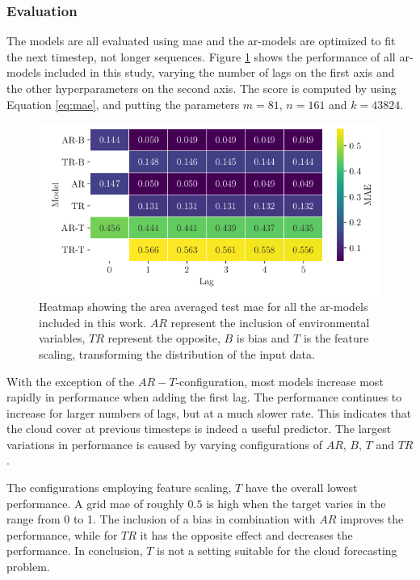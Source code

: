 \subsubsection{Evaluation}
The models are all evaluated using \acrfull{mae} and the \acrshort{ar}-models are optimized to fit the next timestep, not longer sequences. Figure \ref{fig:heatmap_ar_models} shows the performance of all \acrshort{ar}-models included in this study, varying the number of lags on the first axis and the other hyperparameters on the second axis. The score is computed by using Equation \eqref{eq:mae}, and putting the parameters $m = 81$, $n=161$ and $k=43824$. 
\begin{figure}
    \centering
    \includegraphics{python_figs/heat_ar_model_mae_test_score.png}
    \caption{Heatmap showing the area averaged test \acrshort{mae} for all the \acrshort{ar}-models included in this work. $AR$ represent the inclusion of environmental variables, $TR$ represent the opposite, $B$ is bias and $T$ is the feature scaling, transforming the distribution of the input data.
    }
    \label{fig:heatmap_ar_models}
\end{figure}
With the exception of the $AR-T$-configuration, most models increase most rapidly in performance when adding the first lag. The performance continues to increase for larger numbers of lags, but at a much slower rate. This indicates that the cloud cover at previous timesteps is indeed a useful predictor. The largest variations in performance is caused by varying configurations of $AR$, $B$, $T$ and $TR$. 

The configurations employing feature scaling, $T$ have the overall lowest performance. A grid \acrshort{mae} of roughly $0.5$ is high when the target varies in the range from 0 to 1. The inclusion of a bias in combination with $AR$ improves the performance, while for $TR$ it has the opposite effect and decreases the performance. In conclusion, $T$ is not a setting suitable for the cloud forecasting problem.

